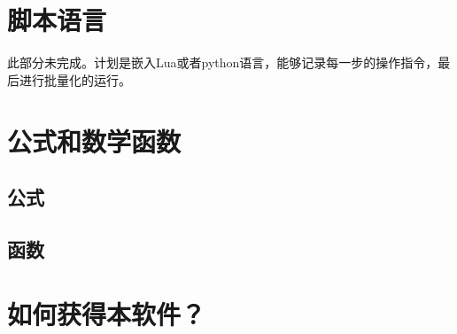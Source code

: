\section{脚本语言}
此部分未完成。计划是嵌入Lua或者python语言，能够记录每一步的操作指令，最后进行批量化的运行。
\section{公式和数学函数}
\subsection{公式}
\subsection{函数}
\section{如何获得本软件？}